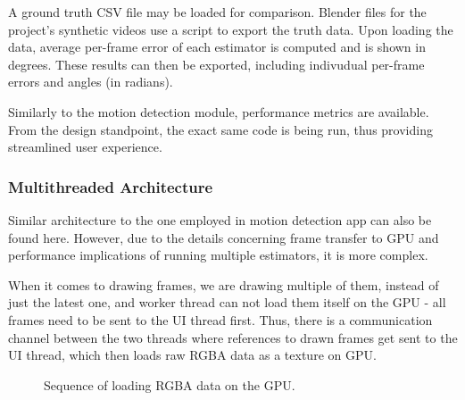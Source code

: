 \documentclass[11pt,english]{report}
\begin{document}
A ground truth CSV file may be loaded for comparison. Blender files for the project's synthetic videos use a script to export the truth data. Upon loading the data, average per-frame error of each estimator is computed and is shown in degrees. These results can then be exported, including indivudual per-frame errors and angles (in radians).

Similarly to the motion detection module, performance metrics are available. From the design standpoint, the exact same code is being run, thus providing streamlined user experience.

\subsubsection{Multithreaded Architecture}

Similar architecture to the one employed in motion detection app can also be found here. However, due to the details concerning frame transfer to GPU and performance implications of running multiple estimators, it is more complex.

When it comes to drawing frames, we are drawing multiple of them, instead of just the latest one, and worker thread can not load them itself on the GPU - all frames need to be sent to the UI thread first. Thus, there is a communication channel between the two threads where references to drawn frames get sent to the UI thread, which then loads raw RGBA data as a texture on GPU.

\begin{figure}[!ht]
	\centering
	\caption{\centering Sequence of loading RGBA data on the GPU.}
\end{figure}
\end{document}
